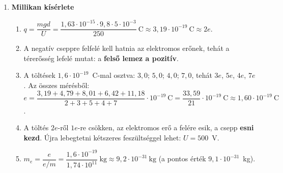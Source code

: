 \documentclass[11pt,a4paper]{article}
\begin{document}
\begin{enumerate}
\item \textbf{Millikan kísérlete}
  \begin{enumerate}
    \item $q = \dfrac{mgd}{U} = \dfrac{1{,}63\cdot 10^{-15}\cdot 9{,}8\cdot 5\cdot 10^{-3}}{250}
      ~\text{C} \approx 3{,}19\cdot 10^{-19}~\text{C} \approx 2e$.
    \item A negatív cseppre felfelé kell hatnia az elektromos erőnek, tehát a térerősség
      lefelé mutat: a \textbf{felső lemez a pozitív}.
    \item A töltések $1{,}6\cdot 10^{-19}$~C-mal osztva: $3{,}0$; $5{,}0$; $4{,}0$; $7{,}0$,
      tehát $3e$, $5e$, $4e$, $7e$. Az összes mérésből:
      $e = \dfrac{3{,}19 + 4{,}79 + 8{,}01 + 6{,}42 + 11{,}18}{2+3+5+4+7}\cdot
      10^{-19}~\text{C} = \dfrac{33{,}59}{21}\cdot 10^{-19}~\text{C}
      \approx 1{,}60\cdot 10^{-19}~\text{C}$.
    \item A töltés $2e$-ről $1e$-re csökken, az elektromos erő a felére esik, a csepp
      \textbf{esni kezd}. Újra lebegtetni kétszeres feszültséggel lehet: $U = 500$~V.
    \item $m_e = \dfrac{e}{e/m} = \dfrac{1{,}6\cdot 10^{-19}}{1{,}74\cdot 10^{11}}~\text{kg}
      \approx 9{,}2\cdot 10^{-31}~\text{kg}$ (a pontos érték $9{,}1\cdot 10^{-31}$~kg).
  \end{enumerate}


\end{enumerate}
\end{document}
